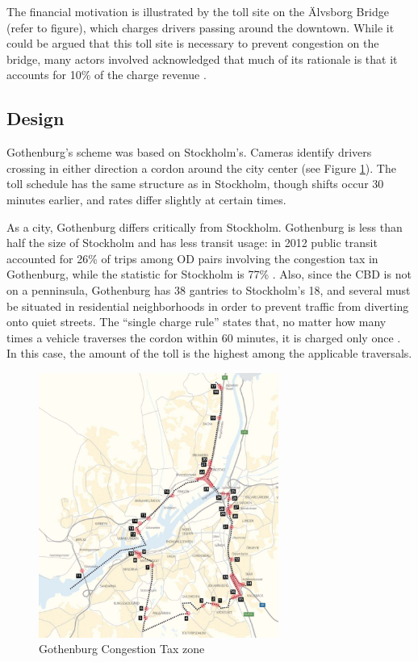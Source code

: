 The financial motivation is illustrated by the toll site on the \"Alvsborg Bridge (refer to figure), which charges drivers passing around the downtown. While it could be argued that this toll site is necessary to prevent congestion on the bridge, many actors involved acknowledged that much of its rationale is that it accounts for 10\% of the charge revenue \citep{Hysing2015b}.

\subsection{Design}

Gothenburg's scheme was based on Stockholm's. Cameras identify drivers crossing in either direction a cordon around the city center (see Figure \ref{fig:Gothenburg-map}). The toll schedule has the same structure as in Stockholm, though shifts occur 30 minutes earlier, and rates differ slightly at certain times. 

As a city, Gothenburg differs critically from Stockholm. Gothenburg is less than half the size of Stockholm and has less transit usage: in 2012 public transit accounted for 26\% of trips among OD pairs involving the congestion tax in Gothenburg, while the statistic for Stockholm is 77\% \citep{Borjesson2015}. Also, since the CBD is not on a penninsula, Gothenburg has 38 gantries to Stockholm's 18, and several must be situated in residential neighborhoods in order to prevent traffic from diverting onto quiet streets. The ``single charge rule'' states that, no matter how many times a vehicle traverses the cordon within 60 minutes, it is charged only once \citep{transportstyrelsen2015}. In this case, the amount of the toll is the highest among the applicable traversals.

\begin{figure}[ht]
\includegraphics[width=0.7\textwidth]{../img/gburg-map.png}

\caption{Gothenburg Congestion Tax zone \citep{transportstyrelsen2015}\label{fig:Gothenburg-map}}
\end{figure}

